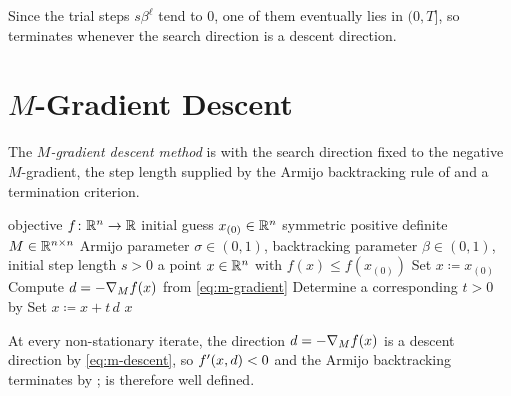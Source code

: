 \documentclass{article}
\newcommand{\iter}[2]{#1_{(#2)}}           %
\begin{document}
Since the trial steps $s\beta^\ell$ tend to $0$, one of them eventually lies in $(0, T]$, so  terminates whenever the search direction is a descent direction.

\section{\texorpdfstring{$M$}{M}-Gradient Descent}
\label{section:gradient}
The \emph{$M$-gradient descent method} is  with the search direction fixed to the negative $M$-gradient, the step length supplied by the Armijo backtracking rule of  and a termination criterion.

\begin{algorithm} \hfill
	\label{algorithm:gradient}
	\begin{algorithmic}[1]
		\Require objective $f \colon \mathbb{R}^n \to \mathbb{R}$
		\Require initial guess $\iter{x}{0} \in \R^n$
		\Require symmetric positive definite $M \in \mathbb{R}^{n \times n}$
		\Require Armijo parameter $\sigma \in (0, 1)$, backtracking parameter $\beta \in (0, 1)$, initial step length $s > 0$
		\Ensure a point $x \in \mathbb{R}^n$ with $f(x) \le f(\iter{x}{0})$
		\State Set $x \coloneqq \iter{x}{0}$
			\State Compute $d = -\nabla_{M} f(x)$ from \eqref{eq:m-gradient}
			\State Determine a corresponding $t > 0$ by 
			\State  Set $x \coloneqq x + t \, d$
		\EndWhile
		\State \Return $x$
	\end{algorithmic}
\end{algorithm}

At every non-stationary iterate, the direction $d = -\nabla_{M} f(x)$ is a descent direction by \eqref{eq:m-descent}, so $f'(x, d) < 0$ and the Armijo backtracking terminates by ;  is therefore well defined.
\end{document}
